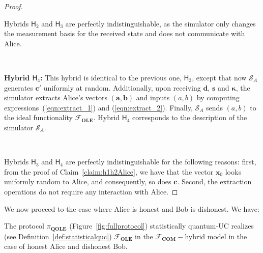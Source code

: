 \begin{proof}
\

 Hybrids $\mathsf{H}_2$ and $ \mathsf{H}_3$ are perfectly indistinguishable, as the simulator only changes the measurement basis for the received state and does not communicate with Alice.

\

\textbf{Hybrid $\mathsf{H}_4$:} This hybrid is identical to the previous one, $\mathsf{H}_3$, except that now $\mathcal{S}_A$ generates $\bm{c}'$ uniformly at random. Additionally, upon receiving $\bm{d}$, $\bm{s}$ and $\bm{\kappa}$, the simulator extracts Alice's vectors $(\bm{a}, \bm{b})$ and inputs $(a, b)$ by computing expressions~(\ref{eqn:extract_1}) and (\ref{eqn:extract_2}). Finally, $\mathcal{S}_A$ sends $(a, b)$ to the ideal functionality $\mathcal{F}_{\textbf{OLE}}$. Hybrid $\mathsf{H}_4$ corresponds to the description of the simulator $\mathcal{S}_A$.

\

Hybrids $\mathsf{H}_3$ and $ \mathsf{H}_4$ are perfectly indistinguishable for the following reasons: first, from the proof of Claim~\ref{claim:h1h2Alice}, we have that the vector $\bm{x}_0$ looks uniformly random to Alice, and consequently, so does $\bm{c}$. Second, the extraction operations do not require any interaction with Alice.
\end{proof}

We now proceed to the case  where Alice is honest and Bob is dishonest. We have:

\begin{lemma}
The protocol $\mathcal{\pi}_{\textbf{QOLE}}$ (Figure~\ref{fig:fullprotocol}) statistically quantum-UC realizes (see Definition~\ref{def:statisticalquc}) $\mathcal{F}_{\textbf{OLE}}$ in the $\mathcal{F}_{\textbf{COM}}-$hybrid model in the case of honest Alice and dishonest Bob.
\label{lemma:dishonestBob}
\end{lemma}


